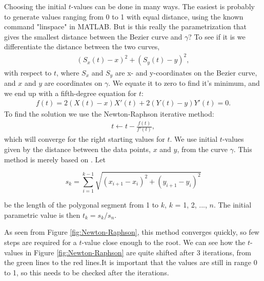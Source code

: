 \documentclass[10pt]{article}
\begin{document}
Choosing the initial $t$-values can be done in many ways. The easiest is probably to generate values ranging from 0 to 1 with equal distance, using the known command "linspace" in MATLAB. But is this really the parametrization that gives the smallest distance between the Bezier curve and $\gamma$? To see if it is we differentiate the distance between the two curves,
\begin{align}
(S_x(t) - x)^2 + (S_y(t) - y)^2,
\end{align}
with respect to $t$, where $S_x$ and $S_y$ are x- and y-coordinates on the Bezier curve, and $x$ and $y$ are coordinates on $\gamma$. We equate it to zero to find it's minimum, and we end up with a fifth-degree equation for $t$:
\begin{align}
f(t) =  2(X(t)-x)X'(t) + 2(Y(t)-y)Y'(t) = 0.
\end{align}
To find the solution we use the Newton-Raphson iterative method:
\begin{align}
t \gets t - \frac{f(t)}{f'(t)},
\end{align}
which will converge for the right starting values for $t$. We use initial $t$-values given by the distance between the data points, $x$ and $y$, from the curve $\gamma$. This method is merely based on \cite{Plass:1983}. Let

\begin{equation}
s_k = \sum_{i=1}^{k-1} \sqrt{(x_{i+1}-x_i)^2 + (y_{i+1}-y_i)^2}
\end{equation}

be the length of the polygonal segment from 1 to $k$, $k$ = 1, 2, ..., $n$. The initial parametric value is then $t_k = s_k/s_n$.

As seen from Figure \ref{fig:Newton-Raphson}, this method converges quickly, so few steps are required for a $t$-value close enough to the root. We can see how the $t$-values in Figure \ref{fig:Newton-Raphson} are quite shifted after 3 iterations, from the green lines to the red lines.It is important that the values are still in range 0 to 1, so this needs to be checked after the iterations. 
\end{document}
